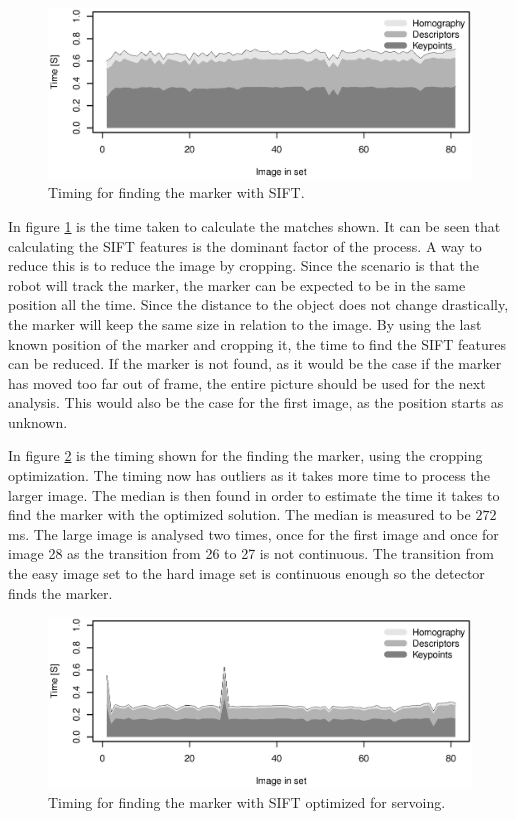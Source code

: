 \begin{figure}[h]
 \centering
 \includegraphics[width=\fullImageWidth]{graphics/marker3_timing_unoptimized}
 \caption{Timing for finding the marker with SIFT.}
 \label{fig:time_sift_unoptimized}
\end{figure}

In figure \ref{fig:time_sift_unoptimized} is the time taken to calculate the matches shown.
It can be seen that calculating the SIFT features is the dominant factor of the process.
A way to reduce this is to reduce the image by cropping.
Since the scenario is that the robot will track the marker, the marker can be expected to be in the same position all the time.
Since the distance to the object does not change drastically, the marker will keep the same size in relation to the image.
By using the last known position of the marker and cropping it, the time to find the SIFT features can be reduced.
If the marker is not found, as it would be the case if the marker has moved too far out of frame, the entire picture should be used for the next analysis.
This would also be the case for the first image, as the position starts as unknown.

In figure \ref{fig:time_sift_crop} is the timing shown for the finding the marker, using the cropping optimization.
The timing now has outliers as it takes more time to process the larger image.
The median is then found in order to estimate the time it takes to find the marker with the optimized solution.
The median is measured to be $272$ ms.
The large image is analysed two times, once for the first image and once for image 28 as the transition from 26 to 27 is not continuous.
The transition from the easy image set to the hard image set is continuous enough so the detector finds the marker.

\begin{figure}[h]
 \centering
 \includegraphics[width=\fullImageWidth]{graphics/marker3_timing_crop}
 \caption{Timing for finding the marker with SIFT optimized for servoing.}
 \label{fig:time_sift_crop}
\end{figure}
